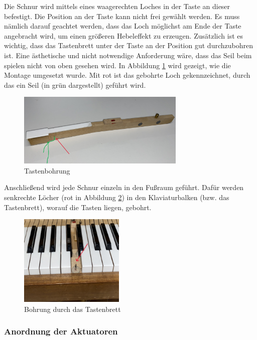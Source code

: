 Die Schnur wird mittels eines waagerechten Loches in der Taste an dieser befestigt.
Die Position an der Taste kann nicht frei gewählt werden.
Es muss nämlich darauf geachtet werden, dass das Loch möglichst am Ende der Taste angebracht wird, um einen größeren Hebeleffekt zu erzeugen.
Zusätzlich ist es wichtig, dass das Tastenbrett unter der Taste an der Position gut durchzubohren ist.
Eine ästhetische und nicht notwendige Anforderung wäre, dass das Seil beim spielen nicht von oben gesehen wird.
In Abbildung \ref{img:Tastenbohrung} wird gezeigt, wie die Montage umgesetzt wurde.
Mit rot ist das gebohrte Loch gekennzeichnet, durch das ein Seil (in grün dargestellt) geführt wird.

\begin{figure}[htbp]
    \centering
    \includegraphics[width=8cm]{img/Taste_schraeg.jpg}
    \caption{Tastenbohrung}
    \label{img:Tastenbohrung}
\end{figure}


Anschließend wird jede Schnur einzeln in den Fußraum geführt.
Dafür werden senkrechte Löcher (rot in Abbildung \ref{fig:klaviatur}) in den Klaviaturbalken (bzw. das Tastenbrett),
worauf die Tasten liegen, gebohrt.

\begin{figure}[htbp]
    \centering
    \includegraphics[width=5cm]{img/Klaviatur.jpg}
    \caption{Bohrung durch das Tastenbrett}
    \label{fig:klaviatur}
\end{figure}

\subsubsection{Anordnung der Aktuatoren}

